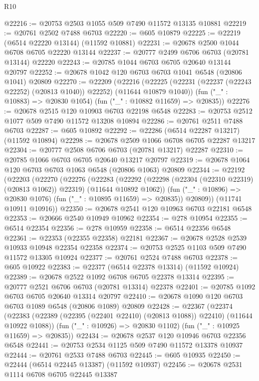 \begin{lexlean}{R10}
\begin{coremodule}
@22216 := @20753 @2503 @1055 @509 @7490 @11572 @13135 @10881
@22219 := @20761 @2502 @7488 @6703
@22220 := @605 @10879
@22225 := @22219 (@6514 @22220 @13144) (@11592 @10881)
@22231 := @20678 @2500 @1044 @6708 @6705 @22220 @13144
@22237 := @20777 @2499 @6706 @6703 (@20781 @13144) @22220
@22243 := @20785 @1044 @6703 @6705 @20640 @13144 @20797
@22252 := @20678 @1042 @120 @6703 @6703 @1041 @6548 (@20806 @1041) @20809
@22270 := @22209
    (@22216
      (@22225 (@22231 (@22237 (@22243 @22252) (@20813 @1040)) @22252) (@11644 @10879 @1040))
      (fun ("_" : @10883) => @20830 @1054)
      (fun ("_" : @10882 @11659) => @20835))
@22276 := @20678 @2515 @120 @10903 @6703 @22198 @6548
@22283 := @20753 @2512 @1077 @509 @7490 @11572 @13208 @10894
@22286 := @20761 @2511 @7488 @6703
@22287 := @605 @10892
@22292 := @22286 (@6514 @22287 @13217) (@11592 @10894)
@22298 := @20678 @2509 @1066 @6708 @6705 @22287 @13217
@22304 := @20777 @2508 @6706 @6703 (@20781 @13217) @22287
@22310 := @20785 @1066 @6703 @6705 @20640 @13217 @20797
@22319 := @20678 @1064 @120 @6703 @6703 @1063 @6548 (@20806 @1063) @20809
@22344 := @22192
    (@22203
      (@22270
        (@22276
          (@22283
            (@22292 (@22298 (@22304 (@22310 @22319) (@20813 @1062)) @22319) (@11644 @10892 @1062))
            (fun ("_" : @10896) => @20830 @1076)
            (fun ("_" : @10895 @11659) => @20835))
          @20809))
      (@11741 @10911 @10916))
@22350 := @20678 @2541 @120 @10963 @6703 @22181 @6548
@22353 := @20666 @2540 @10949 @10962
@22354 := @278 @10954
@22355 := @6514 @22354
@22356 := @278 @10959
@22358 := @6514 @22356 @6548
@22361 := @22353 (@22355 @22358) @22181
@22367 := @20678 @2528 @2539 @10933 @10948 @22354 @22358
@22374 := @20753 @2525 @1103 @509 @7490 @11572 @13305 @10924
@22377 := @20761 @2524 @7488 @6703
@22378 := @605 @10922
@22383 := @22377 (@6514 @22378 @13314) (@11592 @10924)
@22389 := @20678 @2522 @1092 @6708 @6705 @22378 @13314
@22395 := @20777 @2521 @6706 @6703 (@20781 @13314) @22378
@22401 := @20785 @1092 @6703 @6705 @20640 @13314 @20797
@22410 := @20678 @1090 @120 @6703 @6703 @1089 @6548 (@20806 @1089) @20809
@22428 := @22367
    (@22374
      (@22383 (@22389 (@22395 (@22401 @22410) (@20813 @1088)) @22410) (@11644 @10922 @1088))
      (fun ("_" : @10926) => @20830 @1102)
      (fun ("_" : @10925 @11659) => @20835))
@22434 := @20678 @2537 @120 @10946 @6703 @22356 @6548
@22441 := @20753 @2534 @1125 @509 @7490 @11572 @13378 @10937
@22444 := @20761 @2533 @7488 @6703
@22445 := @605 @10935
@22450 := @22444 (@6514 @22445 @13387) (@11592 @10937)
@22456 := @20678 @2531 @1114 @6708 @6705 @22445 @13387

\end{coremodule}
\end{lexlean}
